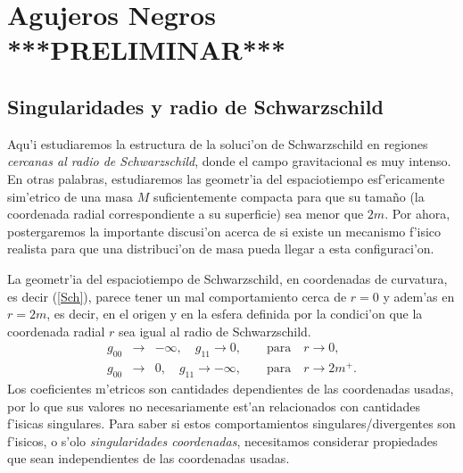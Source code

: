 \chapter{Agujeros Negros ***PRELIMINAR***}


\section{Singularidades y radio de Schwarzschild}

Aqu'i estudiaremos la estructura de la soluci'on de Schwarzschild en regiones \textit{cercanas al radio de Schwarzschild}, donde el campo gravitacional es muy intenso. En otras palabras, estudiaremos las geometr'ia del espaciotiempo esf'ericamente sim'etrico de una masa $M$ suficientemente compacta para que su tama\~no (la coordenada radial correspondiente a su superficie) sea menor que $2m$. Por ahora, postergaremos la importante discusi'on acerca de si existe un mecanismo f'isico realista para que una distribuci'on de masa pueda llegar a esta configuraci'on.

La geometr'ia del espaciotiempo de Schwarzschild, en coordenadas de
curvatura, es decir (\ref{Sch}), parece tener un mal comportamiento cerca de
$r=0$ y adem'as en $r=2m$, es decir, en el origen y en la esfera definida por
la condici'on que la coordenada radial $r$ sea igual al radio de Schwarzschild.
\begin{eqnarray}
 g_{00}&\to& -\infty,\quad g_{11}\to 0, \qquad \text{para}\quad r\to 0 ,\\
 g_{00}&\to& 0,\quad g_{11}\to -\infty, \qquad \text{para}\quad r\to 2m^+ .
\end{eqnarray}
Los coeficientes m'etricos son cantidades dependientes de las coordenadas
usadas, por lo que sus valores no necesariamente est'an relacionados con
cantidades f'isicas singulares. Para saber si estos comportamientos
singulares/divergentes son f'isicos, o s'olo \textit{singularidades coordenadas},
necesitamos considerar propiedades que sean independientes de las coordenadas
usadas.

